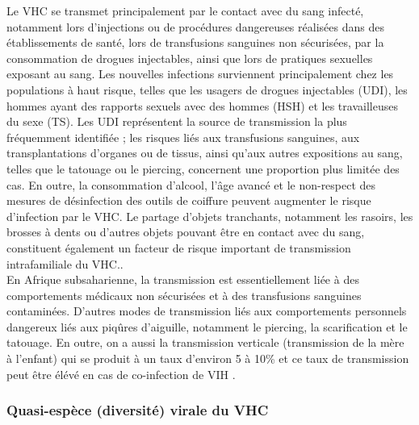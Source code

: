 \documentclass[a4paper,12pt]{article}
\begin{document}
 
Le VHC se transmet principalement par le contact avec du sang infecté, notamment lors d’injections ou de procédures dangereuses réalisées dans des établissements de santé, lors de transfusions sanguines non sécurisées, par la consommation de drogues injectables, ainsi que lors de pratiques sexuelles exposant au sang. Les nouvelles infections surviennent principalement chez les populations à haut risque, telles que les usagers de drogues injectables (UDI), les hommes ayant des rapports sexuels avec des hommes (HSH) et les travailleuses du sexe (TS). Les UDI représentent la source de transmission la plus fréquemment identifiée ; les risques liés aux transfusions sanguines, aux transplantations d’organes ou de tissus, ainsi qu’aux autres expositions au sang, telles que le tatouage ou le piercing, concernent une proportion plus limitée des cas. En outre, la consommation d’alcool, l’âge avancé et le non-respect des mesures de désinfection des outils de coiffure peuvent augmenter le risque d’infection par le VHC. Le partage d’objets tranchants, notamment les rasoirs, les brosses à dents ou d’autres objets pouvant être en contact avec du sang, constituent également un facteur de risque important de transmission intrafamiliale du VHC.\cite{allardFacteursRisquePour2008,PrevalenceVHCRisque,kpossouSeroprevalenceAnticorpsAntivirus2021}.
\\
En Afrique subsaharienne, la transmission est essentiellement liée à des comportements médicaux non sécurisées et à des transfusions sanguines contaminées. D’autres modes de transmission liés aux comportements personnels dangereux liés aux piqûres d'aiguille, notamment le piercing, la scarification et le tatouage. En outre, on a aussi la transmission verticale (transmission de la mère à l'enfant) qui se produit à un taux d'environ 5 à 10\%  et ce taux de transmission peut être élévé en cas de co-infection de VIH  \cite{ouobaEpidemiologicProfileHepatitis2021, Hepatitisb,bartlettPatternsCorrelatesHepatitis2022,pediatriePriseChargeNourrissons}.\\


 
 
 \subsubsection  {Quasi-espèce (diversité) virale du VHC}
  
\end{document}
